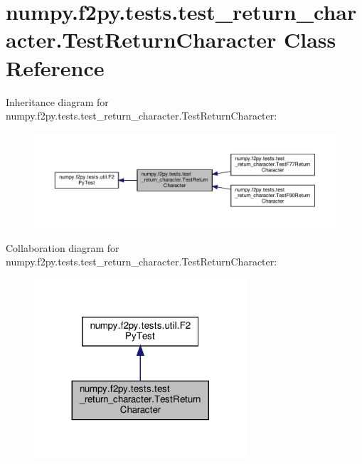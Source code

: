 \hypertarget{classnumpy_1_1f2py_1_1tests_1_1test__return__character_1_1TestReturnCharacter}{}\section{numpy.\+f2py.\+tests.\+test\+\_\+return\+\_\+character.\+Test\+Return\+Character Class Reference}
\label{classnumpy_1_1f2py_1_1tests_1_1test__return__character_1_1TestReturnCharacter}


Inheritance diagram for numpy.\+f2py.\+tests.\+test\+\_\+return\+\_\+character.\+Test\+Return\+Character\+:
\nopagebreak
\begin{figure}[H]
\begin{center}
\leavevmode
\includegraphics[width=350pt]{classnumpy_1_1f2py_1_1tests_1_1test__return__character_1_1TestReturnCharacter__inherit__graph}
\end{center}
\end{figure}


Collaboration diagram for numpy.\+f2py.\+tests.\+test\+\_\+return\+\_\+character.\+Test\+Return\+Character\+:
\nopagebreak
\begin{figure}[H]
\begin{center}
\leavevmode
\includegraphics[width=224pt]{classnumpy_1_1f2py_1_1tests_1_1test__return__character_1_1TestReturnCharacter__coll__graph}
\end{center}
\end{figure}
